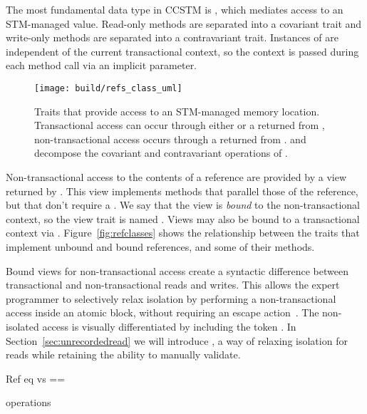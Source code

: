 The most fundamental data type in CCSTM is , which mediates
access to an STM-managed value.  Read-only methods are separated into
a covariant  trait and write-only methods are separated
into a contravariant  trait.  Instances of  are
independent of the current transactional context, so the context is
passed during each method call via an implicit parameter.

\begin{figure*}
  \centering
  \texttt{[image: build/refs\_class\_uml]}

\caption{Traits that provide access to an STM-managed memory
location.  Transactional access can occur through either 
or a  returned from ,
non-transactional access occurs through a  returned
from .   and 
decompose the covariant and contravariant operations of .}

\label{fig:refsclasses}
\end{figure*}

Non-transactional access to the contents of a reference are provided by
a view returned by .  This view implements methods that
parallel those of the reference, but that don't require a .
We say that the view is \textit{bound} to the non-transactional
context, so the view trait is named .  Views may
also be bound to a transactional context via .
Figure~\ref{fig:refclasses} shows the  relationship
between the traits that implement unbound and bound references, and 
some of their methods.

Bound views for non-transactional access create a syntactic difference
between transactional and non-transactional reads and writes.
This allows the expert programmer to selectively relax isolation by
performing a non-transactional access inside an atomic block, without
requiring an escape action~\cite{escapeaction}.  The non-isolated access
is visually differentiated by including the token .  In
Section~\ref{sec:unrecordedread} we will introduce ,
a way of relaxing isolation for reads while retaining the ability to
manually validate.


Ref eq vs ==

operations
